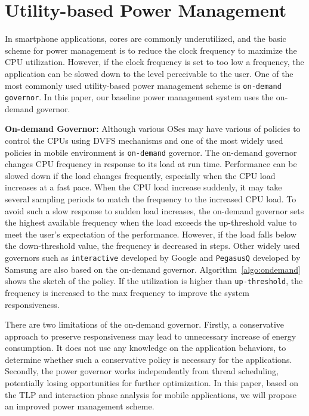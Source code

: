 \section{Utility-based Power Management}

In smartphone applications, cores are commonly underutilized, and the basic scheme for 
power management is to reduce the clock frequency to maximize the CPU utilization.
However, if the clock frequency is set to too low a frequency, the application can be slowed down
to the level perceivable to the user. One of the most commonly used utility-based
power management scheme is {\tt on-demand governor}. In this paper, our baseline
power management system uses the on-demand governor.

{\bf On-demand Governor: } 
Although various OSes may have various of policies to control the CPUs using DVFS mechanisms 
and one of the most widely used policies in mobile environment is {\tt on-demand} governor. 
The on-demand governor changes CPU frequency in response to its load at run time.
Performance can be slowed down if the load changes frequently, especially when the CPU load increases at a fast pace. When the CPU load increase suddenly, it may take several sampling periods
to match the frequency to the increased CPU load.
To avoid such a slow response to sudden load increases, the on-demand governor sets the highest available frequency 
when the load exceeds the up-threshold value to meet the user's expectation of the performance.
However, if the load falls below the down-threshold value, the frequency is decreased in steps.
Other widely used governors such as {\tt interactive} developed by Google and {\tt PegasusQ} developed by Samsung
are also based on the on-demand governor.
Algorithm~\ref{algo:ondemand} shows the sketch of the policy. If the utilization is higher than {\tt up-threshold},
the frequency is increased to the max frequency to improve the system responsiveness.

There are two limitations of the on-demand governor. Firstly, a conservative approach to preserve responsiveness 
may lead to unnecessary increase of energy consumption. It does not use any knowledge on the application
behaviors, to determine whether such a conservative policy is necessary for the applications.
Secondly,
the power governor works independently from thread scheduling, potentially losing opportunities for
further optimization. In this paper, based on the TLP and interaction phase analysis for mobile applications,
we will propose an improved power management scheme. 

